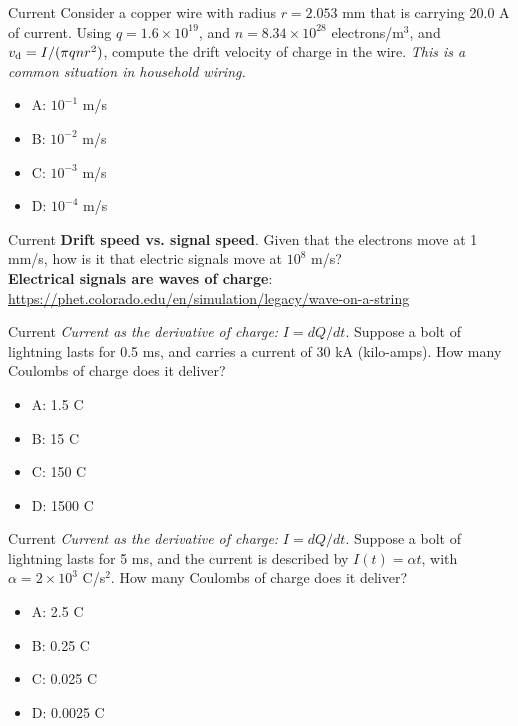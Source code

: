 \documentclass{beamer}
\begin{document}
\begin{frame}{Current}
Consider a copper wire with radius $r = 2.053$ mm that is carrying 20.0 A of current.  Using $q = 1.6\times 10^{19}$, and $n = 8.34 \times 10^{28}$ electrons/m$^3$, and $v_{\rm d} = I/(\pi q n r^2)$, compute the drift velocity of charge in the wire.  \textit{This is a common situation in household wiring.}
\begin{itemize}
\item A: $10^{-1}$ m/s
\item B: $10^{-2}$ m/s
\item C: $10^{-3}$ m/s
\item D: $10^{-4}$ m/s
\end{itemize}
\end{frame}

\begin{frame}{Current}
\textbf{Drift speed vs. signal speed}.  Given that the electrons move at 1 mm/s, how is it that electric signals move at $10^8$ m/s? \\ \vspace{1cm}
\textbf{Electrical signals are \alert{waves} of charge}: \\ \url{https://phet.colorado.edu/en/simulation/legacy/wave-on-a-string}
\end{frame}

\begin{frame}{Current}
\textit{Current as the derivative of charge:} $I = dQ/dt$.  Suppose a bolt of lightning lasts for 0.5 ms, and carries a current of 30 kA (kilo-amps).  How many Coulombs of charge does it deliver?
\begin{itemize}
\item A: 1.5 C
\item B: 15 C
\item C: 150 C
\item D: 1500 C
\end{itemize}
\end{frame}

\begin{frame}{Current}
\textit{Current as the derivative of charge:} $I = dQ/dt$.  Suppose a bolt of lightning lasts for 5 ms, and the current is described by $I(t) = \alpha t$, with $\alpha = 2\times 10^3$ C/s$^2$.  How many Coulombs of charge does it deliver?
\begin{itemize}
\item A: 2.5 C
\item B: 0.25 C
\item C: 0.025 C
\item D: 0.0025 C
\end{itemize}
\end{frame}
\end{document}
